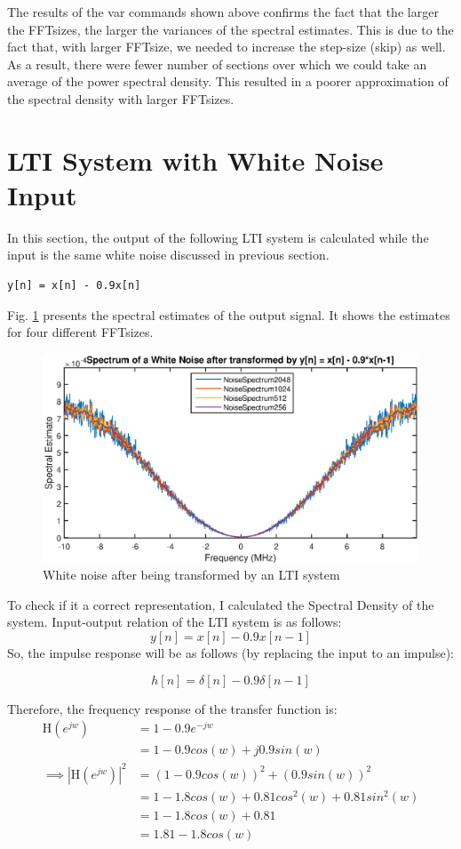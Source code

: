 \documentclass[12pt]{article}
\begin{document}
The results of the var commands shown above confirms the fact that the larger the FFTsizes, the larger the variances of the spectral estimates. This is due to the fact that, with larger FFTsize, we needed to increase the step-size (skip) as well. As a result, there were fewer number of sections over which we could take an average of the power spectral density. This resulted in a poorer approximation of the spectral density with larger FFTsizes. 

\section{LTI System with White Noise Input}
In this section, the output of the following LTI system is calculated while the input is the same white noise discussed in previous section.
\begin{verbatim}
y[n] = x[n] - 0.9x[n]
\end{verbatim}
Fig. \ref{fig:spectralEst_transform} presents the spectral estimates of the output signal. It shows the estimates for four different FFTsizes.
\begin{figure}[h]
    \centering
    \includegraphics[width=1\textwidth]{spectralestimate_transform}
    \caption{White noise after being transformed by an LTI system}
    \label{fig:spectralEst_transform}
\end{figure}

To check if it a correct representation, I calculated the Spectral Density of the system. Input-output relation of the LTI system is as follows:
\[
y[n]=x[n]-0.9x[n-1]
\]
So, the impulse response will be as follows (by replacing the input
to an impulse):

\[
h[n]=\delta[n]-0.9\delta[n-1]
\]


Therefore, the frequency response of the transfer function is:
\begin{align*}
\text{H}(e^{jw}) & =1-0.9e^{-jw}\\
 & =1-0.9cos(w)+j0.9sin(w)\\
\implies\left|\text{H}(e^{jw})\right|^{2} & =(1-0.9cos(w))^{2}+(0.9sin(w))^{2}\\
 & =1-1.8cos(w)+0.81cos^{2}(w)+0.81sin^{2}(w)\\
 & =1-1.8cos(w)+0.81\\
 & =1.81-1.8cos(w)
\end{align*}
\end{document}
